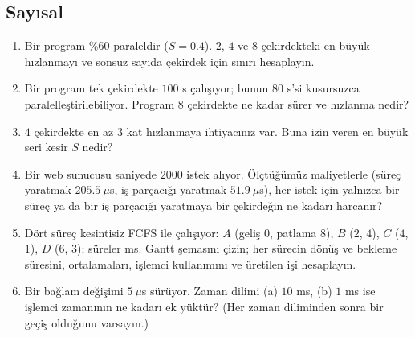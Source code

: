 \documentclass[11pt,a4paper]{article}
\begin{document}
\subsection*{Sayısal}
\begin{enumerate}[leftmargin=1.6em,resume]
  \item Bir program \%60 paraleldir ($S = 0.4$). $2$, $4$ ve $8$ çekirdekteki en büyük hızlanmayı ve sonsuz sayıda çekirdek için sınırı hesaplayın.
  \item Bir program tek çekirdekte $100$ s çalışıyor; bunun $80$ s'si kusursuzca paralelleştirilebiliyor. Program $8$ çekirdekte ne kadar sürer ve hızlanma nedir?
  \item $4$ çekirdekte en az $3$ kat hızlanmaya ihtiyacınız var. Buna izin veren en büyük seri kesir $S$ nedir?
  \item Bir web sunucusu saniyede $2000$ istek alıyor. Ölçtüğümüz maliyetlerle (süreç yaratmak $205.5\ \mu$s, iş parçacığı yaratmak $51.9\ \mu$s), her istek için yalnızca bir süreç ya da bir iş parçacığı yaratmaya bir çekirdeğin ne kadarı harcanır?
  \item Dört süreç kesintisiz FCFS ile çalışıyor: $A$ (geliş $0$, patlama $8$), $B$ ($2$, $4$), $C$ ($4$, $1$), $D$ ($6$, $3$); süreler ms. Gantt şemasını çizin; her sürecin dönüş ve bekleme süresini, ortalamaları, işlemci kullanımını ve üretilen işi hesaplayın.
  \item Bir bağlam değişimi $5\ \mu$s sürüyor. Zaman dilimi (a) $10$ ms, (b) $1$ ms ise işlemci zamanının ne kadarı ek yüktür? (Her zaman diliminden sonra bir geçiş olduğunu varsayın.)
\end{enumerate}
\end{document}
